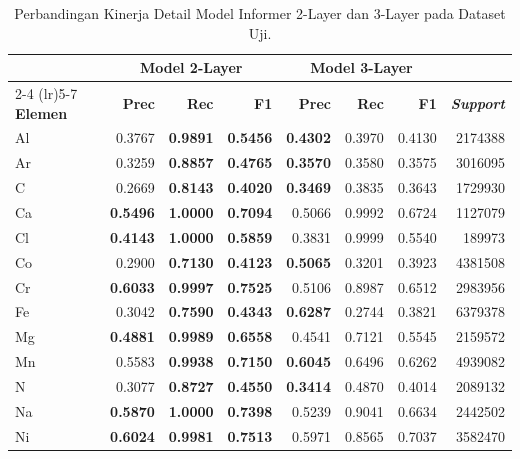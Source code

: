 \begin{table}[H]
    \centering
    \begin{threeparttable}
    \small
    \caption{Perbandingan Kinerja Detail Model Informer 2-Layer dan 3-Layer pada Dataset Uji.}
    \label{tab:perbandingan_lengkap}
    \begin{tabular}{l rrr rrr r}
        \toprule
        & \multicolumn{3}{c}{\textbf{Model 2-Layer}} & \multicolumn{3}{c}{\textbf{Model 3-Layer}} & \\
        \cmidrule(lr){2-4} \cmidrule(lr){5-7}
        \textbf{Elemen} & \textbf{Prec} & \textbf{Rec} & \textbf{F1} & \textbf{Prec} & \textbf{Rec} & \textbf{F1} & \textbf{\textit{Support}} \\
        \midrule
        Al & 0.3767 & \textbf{0.9891} & \textbf{0.5456} & \textbf{0.4302} & 0.3970 & 0.4130 & 2174388 \\
        Ar & 0.3259 & \textbf{0.8857} & \textbf{0.4765} & \textbf{0.3570} & 0.3580 & 0.3575 & 3016095 \\
        C  & 0.2669 & \textbf{0.8143} & \textbf{0.4020} & \textbf{0.3469} & 0.3835 & 0.3643 & 1729930 \\
        Ca & \textbf{0.5496} & \textbf{1.0000} & \textbf{0.7094} & 0.5066 & 0.9992 & 0.6724 & 1127079 \\
        Cl & \textbf{0.4143} & \textbf{1.0000} & \textbf{0.5859} & 0.3831 & 0.9999 & 0.5540 & 189973 \\
        Co & 0.2900 & \textbf{0.7130} & \textbf{0.4123} & \textbf{0.5065} & 0.3201 & 0.3923 & 4381508 \\
        Cr & \textbf{0.6033} & \textbf{0.9997} & \textbf{0.7525} & 0.5106 & 0.8987 & 0.6512 & 2983956 \\
        Fe & 0.3042 & \textbf{0.7590} & \textbf{0.4343} & \textbf{0.6287} & 0.2744 & 0.3821 & 6379378 \\
        Mg & \textbf{0.4881} & \textbf{0.9989} & \textbf{0.6558} & 0.4541 & 0.7121 & 0.5545 & 2159572 \\
        Mn & 0.5583 & \textbf{0.9938} & \textbf{0.7150} & \textbf{0.6045} & 0.6496 & 0.6262 & 4939082 \\
        N  & 0.3077 & \textbf{0.8727} & \textbf{0.4550} & \textbf{0.3414} & 0.4870 & 0.4014 & 2089132 \\
        Na & \textbf{0.5870} & \textbf{1.0000} & \textbf{0.7398} & 0.5239 & 0.9041 & 0.6634 & 2442502 \\
        Ni & \textbf{0.6024} & \textbf{0.9981} & \textbf{0.7513} & 0.5971 & 0.8565 & 0.7037 & 3582470 \\

\end{tabular}
\end{threeparttable}
\end{table}
